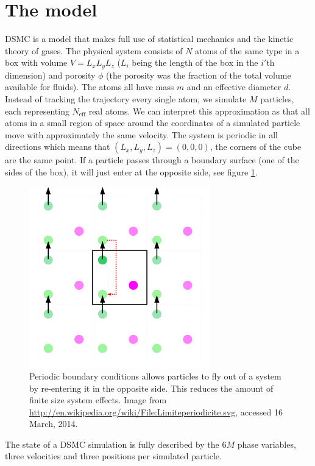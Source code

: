 \section{The model}
\label{sec:dsmc_model}
DSMC is a model that makes full use of statistical mechanics and the kinetic theory of gases. The physical system consists of $N$ atoms of the same type in a box with volume $V = L_xL_yL_z$ ($L_i$ being the length of the box in the $i'$th dimension) and porosity $\phi$ (the porosity was the fraction of the total volume available for fluids). The atoms all have mass $m$ and an effective diameter $d$. Instead of tracking the trajectory every single atom, we simulate $M$ particles, each representing $N_\text{eff}$ real atoms. We can interpret this approximation as that all atoms in a small region of space around the coordinates of a simulated particle move with approximately the same velocity. The system is periodic in all directions which means that $(L_x, L_y, L_z) = (0,0,0)$, the corners of the cube are the same point. If a particle passes through a boundary surface (one of the sides of the box), it will just enter at the opposite side, see figure \ref{fig:dsmc_periodic_boundary_conditions}.
\begin{figure}[ht]
\begin{center}
\includegraphics[width=0.7\textwidth, trim=0cm 0cm 0cm 0cm]{DSMC/figures/periodic_boundary_conditions.png}
\end{center}
\caption{Periodic boundary conditions allows particles to fly out of a system by re-entering it in the opposite side. This reduces the amount of finite size system effects. Image from \url{http://en.wikipedia.org/wiki/File:Limiteperiodicite.svg}, accessed 16 March, 2014.}
\label{fig:dsmc_periodic_boundary_conditions}
\end{figure}
The state of a DSMC simulation is fully described by the $6M$ phase variables, three velocities and three positions per simulated particle.

